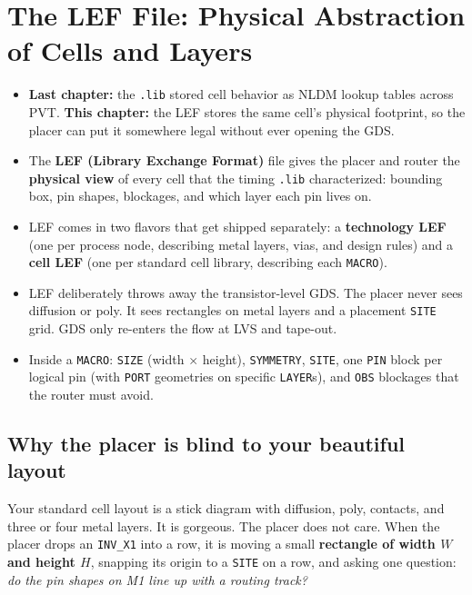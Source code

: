 \chapter{The LEF File: Physical Abstraction of Cells and Layers}

\begin{tldr}
\begin{itemize}[leftmargin=*,nosep]
  \item \textbf{Last chapter:} the \texttt{.lib} stored cell behavior as NLDM lookup tables across PVT. \textbf{This chapter:} the LEF stores the same cell's physical footprint, so the placer can put it somewhere legal without ever opening the GDS.
  \item The \textbf{LEF (Library Exchange Format)} file gives the placer and router the \textbf{physical view} of every cell that the timing \texttt{.lib} characterized: bounding box, pin shapes, blockages, and which layer each pin lives on.
  \item LEF comes in two flavors that get shipped separately: a \textbf{technology LEF} (one per process node, describing metal layers, vias, and design rules) and a \textbf{cell LEF} (one per standard cell library, describing each \texttt{MACRO}).
  \item LEF deliberately throws away the transistor-level GDS. The placer never sees diffusion or poly. It sees rectangles on metal layers and a placement \texttt{SITE} grid. GDS only re-enters the flow at LVS and tape-out.
  \item Inside a \texttt{MACRO}: \texttt{SIZE} (width $\times$ height), \texttt{SYMMETRY}, \texttt{SITE}, one \texttt{PIN} block per logical pin (with \texttt{PORT} geometries on specific \texttt{LAYER}s), and \texttt{OBS} blockages that the router must avoid.
\end{itemize}
\end{tldr}

\section{Why the placer is blind to your beautiful layout}

Your standard cell layout is a stick diagram with diffusion, poly, contacts, and three or four metal layers. It is gorgeous. The placer does not care. When the placer drops an \texttt{INV\_X1} into a row, it is moving a small \textbf{rectangle of width $W$ and height $H$}, snapping its origin to a \texttt{SITE} on a row, and asking one question: \emph{do the pin shapes on M1 line up with a routing track?}

